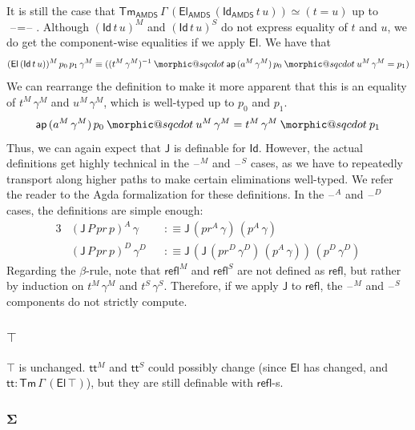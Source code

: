 \documentclass[12pt,a4paper,twoside,openany]{book}
\makeatletter
\DeclareRobustCommand{\sqcdot}{\mathbin{\mathpalette\morphic@sqcdot\relax}}
\newcommand{\morphic@sqcdot}[2]{%
  \sbox\z@{$\m@th#1\centerdot$}%
  \ht\z@=.33333\ht\z@
  \vcenter{\box\z@}%
}
\theoremstyle{remark}
\theoremstyle{definition}
\theoremstyle{theorem}
\newcommand{\mi}[1]{\mathit{#1}}
\newcommand{\ms}[1]{\mathsf{#1}}
\newcommand{\bs}[1]{\boldsymbol{#1}}
\newcommand{\ap}{\ms{ap}}
\newcommand{\J}{\ms{J}}
\newcommand{\refl}{\mathsf{refl}}
\newcommand{\Tm}{\mathsf{Tm}}
\newcommand{\El}{\mathsf{El}}
\newcommand{\Id}{\mathsf{Id}}
\renewcommand{\tt}{\mathsf{tt}}
\newcommand{\blank}{\mathord{\hspace{1pt}\text{--}\hspace{1pt}}}
\newcommand{\defn}{:\equiv}
\makeatother
\begin{document}
It is still the case that
$\Tm_{\ms{AMDS}}\,\Gamma\,(\El_{\ms{AMDS}}\,(\Id_{\ms{AMDS}}\,t\,u)) \simeq (t =
u)$ up to $\blank\!=\!\blank$. Although $(\Id\,t\,u)^M$ and $(\Id\,t\,u)^S$ do
not express equality of $t$ and $u$, we do get the component-wise equalities if
we apply $\El$. We have that
\[
(\El\,(\Id\,t\,u))^M\,p_0\,p_1\,\gamma^M
\equiv ((t^M\,\gamma^M)^{-1} \sqcdot \ap\,(a^M\,\gamma^M)\,p_0 \sqcdot u^M\,\gamma^M = p_1)
\]
We can rearrange the definition to make it more apparent that this is an equality
of $t^M\,\gamma^M$ and $u^M\,\gamma^M$, which is well-typed up to $p_0$ and $p_1$.
\[
  \ap\,(a^M\,\gamma^M)\,p_0 \sqcdot u^M\,\gamma^M = t^M\,\gamma^M \sqcdot p_1
\]
Thus, we can again expect that $\J$ is definable for $\Id$. However, the actual
definitions get highly technical in the $\blank^M$ and $\blank^S$ cases, as we
have to repeatedly transport along higher paths to make certain eliminations
well-typed. We refer the reader to the Agda formalization \cite{ak-thesis-agda}
for these definitions. In the $\blank^A$ and $\blank^D$ cases, the definitions
are simple enough:
\begin{alignat*}{3}
  &(\J\,P\,\mi{pr}\,p)^A\,\gamma   &&\defn \J\,(\mi{pr}^A\,\gamma)\,(p^A\,\gamma)\\
  &(\J\,P\,\mi{pr}\,p)^D\,\gamma^D &&\defn \J\,(\J\,(\mi{pr}^D\,\gamma^D)\,(p^A\,\gamma))\,(p^D\,\gamma^D)
\end{alignat*}
Regarding the $\beta$-rule, note that $\refl^M$ and $\refl^S$ are not defined as
$\refl$, but rather by induction on $t^M\,\gamma^M$ and
$t^S\,\gamma^S$. Therefore, if we apply $\J$ to $\refl$, the $\blank^M$ and
$\blank^S$ components do not strictly compute.

\subsubsection{$\bs{\top}$}

$\top$ is unchanged. $\tt^M$ and $\tt^S$ could possibly change (since $\El$ has
changed, and $\tt : \Tm\,\Gamma\,(\El\,\top)$), but they are still definable
with $\refl$-s.

\subsubsection{$\bs{\Sigma}$}
\end{document}
